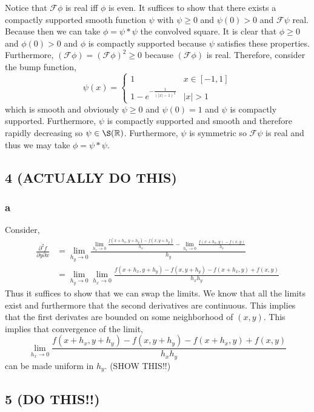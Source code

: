\documentclass[12pt]{article}
\newcommand{\R}{\mathbb{R}}
\renewcommand{\F}{\mathcal{F}}
\begin{document}
Notice that $\F \phi$ is real iff $\phi$ is even. It suffices to show that there exists a compactly supported smooth function $\psi$ with $\psi \ge 0$ and $\psi(0) > 0$ and $\F \psi$ real. Because then we can take $\phi = \psi * \psi$ the convolved square. It is clear that $\phi \ge 0$ and $\phi(0) > 0$ and $\phi$ is compactly supported because $\psi$ satisfies these properties. Furthermore, $(\F \phi) = (\F \phi)^2 \ge 0$ because $(\F \phi)$ is real. Therefore, consider the bump function,
\[ \psi(x) = 
\begin{cases}
1 & x \in [-1,1]
\\
1 - e^{-\frac{1}{(|x| - 1)^2}} & |x| > 1
\end{cases} \]
which is smooth and obviously $\psi \ge 0$ and $\psi(0) = 1$ and $\psi$ is compactly supported. Furthermore, $\psi$ is compactly supported and smooth and therefore rapidly decreasing so $\psi \in \S(\R)$. Furthermore, $\psi$ is symmetric so $\F \psi$ is real and thus we may take $\phi = \psi * \psi$.


\subsection{4 (ACTUALLY DO THIS)}

\subsubsection{a}

Consider,
\begin{align*}
\frac{\partial^2 f}{\partial y \partial x} & = \lim\limits_{h_y \to 0} \frac{\lim\limits_{h_x \to 0} \frac{f(x + h_x, y + h_y) - f(x, y + h_y)}{h_x} - \lim\limits_{h_x \to 0} \frac{f(x + h_x, y) - f(x,y)}{h_x}}{h_y} 
\\
& = \lim_{h_y \to 0} \lim_{h_x \to 0} \frac{f(x + h_x, y + h_y) - f(x, y+ h_y) - f(x + h_x, y) + f(x, y)}{h_x h_y}
\end{align*}
Thus it suffices to show that we can swap the limits. We know that all the limits exist and furthermore that the second derivatives are continuous. This implies that the first derivates are bounded on some neighborhood of $(x,y)$. This implies that convergence of the limit,
\[  \lim_{h_x \to 0} \frac{f(x + h_x, y + h_y) - f(x, y+ h_y) - f(x + h_x, y) + f(x, y)}{h_x h_y} \]
can be made uniform in $h_y$. (SHOW THIS!!)


\subsection{5 (DO THIS!!)}
\end{document}
